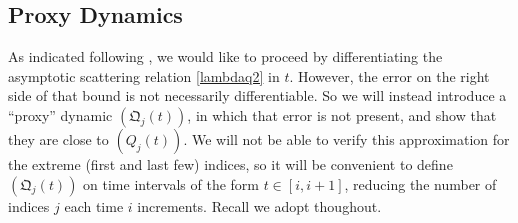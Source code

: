 \documentclass{amsart}
\numberwithin{equation}{section}
\theoremstyle{remark}
\theoremstyle{definition}
\begin{document}
	\subsection{Proxy Dynamics}
	
	\label{Linear0}	
	
	
	As indicated following , we would like to proceed by differentiating the asymptotic scattering relation \eqref{lambdaq2} in $t$. However, the error on the right side of that bound is not necessarily differentiable. So we will instead introduce a ``proxy'' dynamic $(\mathfrak{Q}_j(t))$, in which that error is not present, and show that they are close to $( Q_j (t) )$. We will not be able to verify this approximation for the extreme (first and last few) indices, so it will be convenient to define $( \mathfrak{Q}_j (t) )$ on time intervals of the form $t \in [i,i+1]$, reducing the number of indices $j$ each time $i$ increments. Recall we adopt  thoughout.
	
	
 	
\end{document}
